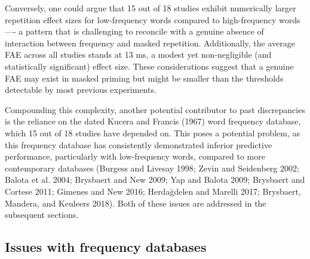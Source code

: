 \documentclass[
]{interact}
\begin{document}
Conversely, one could argue that 15 out of 18 studies exhibit
numerically larger repetition effect sizes for low-frequency words
compared to high-frequency words ---- a pattern that is challenging to
reconcile with a genuine absence of interaction between frequency and
masked repetition. Additionally, the average FAE across all studies
stands at 13 ms, a modest yet non-negligible (and statistically
significant) effect size. These considerations suggest that a genuine
FAE may exist in masked priming but might be smaller than the thresholds
detectable by most previous experiments.

Compounding this complexity, another potential contributor to past
discrepancies is the reliance on the dated Kucera and Francis (1967)
word frequency database, which 15 out of 18 studies have depended on.
This poses a potential problem, as this frequency database has
consistently demonstrated inferior predictive performance, particularly
with low-frequency words, compared to more contemporary databases
(Burgess and Livesay 1998; Zevin and Seidenberg 2002; Balota et al.
2004; Brysbaert and New 2009; Yap and Balota 2009; Brysbaert and Cortese
2011; Gimenes and New 2016; Herdağdelen and Marelli 2017; Brysbaert,
Mandera, and Keuleers 2018). Both of these issues are addressed in the
subsequent sections.

\subsection{Issues with frequency databases}\label{sec-study-freq}
\end{document}
